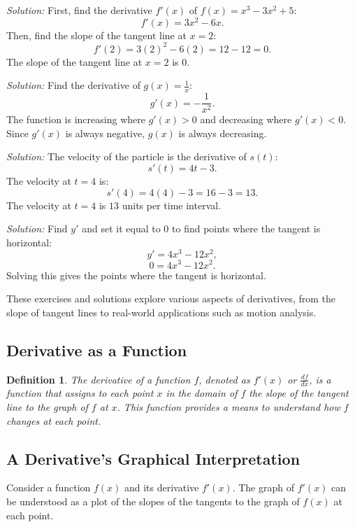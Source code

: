\documentclass[a4paper,12pt]{book}
\newenvironment{solution}[1][]
{\par\noindent\textit{Solution:} \rmfamily}{\medskip}
\newtheorem{definition}{Definition}
\begin{document}
\begin{solution}[to Exercise 1]
First, find the derivative \( f'(x) \) of \( f(x) = x^3 - 3x^2 + 5 \):
\[ f'(x) = 3x^2 - 6x. \]
Then, find the slope of the tangent line at \( x = 2 \):
\[ f'(2) = 3(2)^2 - 6(2) = 12 - 12 = 0. \]
The slope of the tangent line at \( x = 2 \) is \( 0 \).
\end{solution}

\begin{solution}[to Exercise 2]
Find the derivative of \( g(x) = \frac{1}{x} \):
\[ g'(x) = -\frac{1}{x^2}. \]
The function is increasing where \( g'(x) > 0 \) and decreasing where \( g'(x) < 0 \). Since \( g'(x) \) is always negative, \( g(x) \) is always decreasing.
\end{solution}

\begin{solution}[to Exercise 3]
The velocity of the particle is the derivative of \( s(t) \):
\[ s'(t) = 4t - 3. \]
The velocity at \( t = 4 \) is:
\[ s'(4) = 4(4) - 3 = 16 - 3 = 13. \]
The velocity at \( t = 4 \) is \( 13 \) units per time interval.
\end{solution}

\begin{solution}[to Exercise 4]
Find \( y' \) and set it equal to \( 0 \) to find points where the tangent is horizontal:
\[ y' = 4x^3 - 12x^2, \]
\[ 0 = 4x^3 - 12x^2. \]
Solving this gives the points where the tangent is horizontal.
\end{solution}

These exercises and solutions explore various aspects of derivatives, from the slope of tangent lines to real-world applications such as motion analysis.

\subsection{Derivative as a Function}

\begin{definition}
The derivative of a function \( f \), denoted as \( f'(x) \) or \( \frac{df}{dx} \), is a function that assigns to each point \( x \) in the domain of \( f \) the slope of the tangent line to the graph of \( f \) at \( x \). This function provides a means to understand how \( f \) changes at each point.
\end{definition}

\subsection{A Derivative's Graphical Interpretation}
Consider a function \( f(x) \) and its derivative \( f'(x) \). The graph of \( f'(x) \) can be understood as a plot of the slopes of the tangents to the graph of \( f(x) \) at each point.
\end{document}
